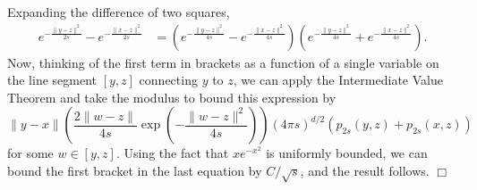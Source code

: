\documentclass[12pt]{article}
\newenvironment {proof}{{\noindent\bf Proof }}{\hfill $\Box$ \medskip}
\numberwithin{equation}{section}
\begin{document}
\begin{proof}

    Expanding the difference of two squares,
    \begin{align*}
        e^{- \frac{\|y-z\|^2}{2 s}}
        -
        e^{- \frac{\|x-z\|^2}{2 s}}
        &=
        \left(
            e^{-\frac{\|y-z\|^2}{4 s}}
            -
            e^{-\frac{\|x-z\|^2}{4 s}}
        \right)
        \left(
            e^{-\frac{\|y-z\|^2}{4 s}}
            +
            e^{-\frac{\|x-z\|^2}{4 s}}
        \right) .
    \end{align*}
Now, thinking of the first term in brackets as a function of a single variable on
the line segment $[y,z]$ connecting $y$ to $z$, we can apply the
Intermediate Value Theorem and take the modulus to bound this expression by 
    \[
        \|y-x\|
        \left( \frac{2\|w-z\|}{4s} \exp\left(-\frac{\|w-z\|^2}{4s}\right)\right)
        (4 \pi s)^{d/2}
        \left( p_{2s}(y,z)+p_{2s}(x,z) \right)
    \]
    for some $w\in [y,z]$.
    Using the fact that $x e^{-x^2}$ is uniformly bounded,
    we can bound the first bracket in the last equation by $C/\sqrt{s}$, and the result follows.
\end{proof}
\end{document}
